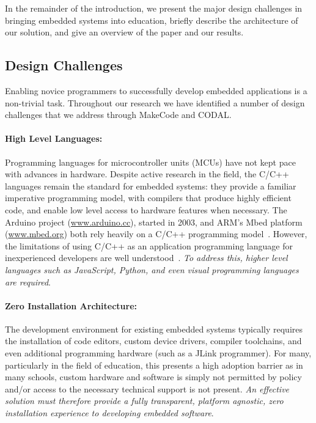 In the remainder of the introduction, we present the major design challenges in
bringing embedded systems into education, briefly describe the
architecture of our solution, and give an overview of the
paper and our results.

\subsection{Design Challenges}
\label{sec:DesignChallenges}
Enabling novice programmers to successfully develop embedded applications is a non-trivial task. Throughout our research we have identified a number of design challenges that we address through MakeCode and CODAL.

\paragraph{High Level Languages:}
Programming languages for microcontroller units (MCUs) have not kept pace with advances in hardware. Despite active research in the field, the C/C++ languages remain the standard for embedded systems: they provide a familiar imperative programming model, with compilers that produce highly efficient code, and enable low level access to hardware features when necessary. The Arduino project (\href{https://www.arduino.cc}{www.arduino.cc}), started in 2003, and ARM's Mbed platform (\href{https://www.mbed.org}{www.mbed.org}) both rely heavily on a C/C++ programming model~\cite{buildingArduino2014,ARMmbed}. However, the limitations of using C/C++ as an application programming language for inexperienced developers are well understood~\cite{blikstein2013gears}. \emph{To address this, higher level languages such as JavaScript, Python, and even visual programming languages are required}.

\paragraph{Zero Installation Architecture:}
The development environment for existing embedded systems typically requires the installation of code editors, custom device drivers, compiler toolchains, and even additional programming hardware (such as a JLink programmer). For many, particularly in the field of education, this presents a high adoption barrier as in many schools, custom hardware and software is simply not permitted by policy and/or access to the necessary technical support is not present. \emph{An effective solution must therefore provide a fully transparent, platform agnostic, zero installation experience to developing embedded software}.

